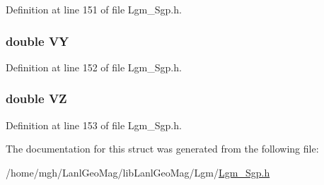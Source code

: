 Definition at line 151 of file Lgm\_\-Sgp.h.\hypertarget{struct___sgp_info_f7687d7aef9103def7b09bcb5d568e04}{
\subsubsection[{VY}]{\setlength{\rightskip}{0pt plus 5cm}double {\bf VY}}}
\label{struct___sgp_info_f7687d7aef9103def7b09bcb5d568e04}




Definition at line 152 of file Lgm\_\-Sgp.h.\hypertarget{struct___sgp_info_b9b9161b8168f9424231c7fc59837f88}{
\subsubsection[{VZ}]{\setlength{\rightskip}{0pt plus 5cm}double {\bf VZ}}}
\label{struct___sgp_info_b9b9161b8168f9424231c7fc59837f88}




Definition at line 153 of file Lgm\_\-Sgp.h.

The documentation for this struct was generated from the following file:\begin{CompactItemize}
\item 
/home/mgh/LanlGeoMag/libLanlGeoMag/Lgm/\hyperlink{_lgm___sgp_8h}{Lgm\_\-Sgp.h}\end{CompactItemize}
